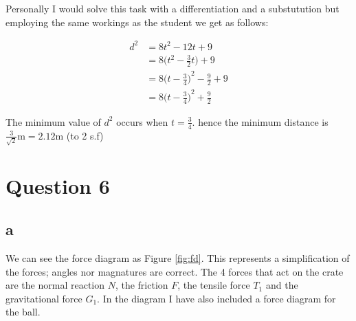 \documentclass{article}
\begin{document}

Personally I would solve this task with a differentiation and a substutution but employing the same workings as the student we get as follows:

\begin{align}
	d^2 & = 8 t^2 - 12 t + 9                       \label{eq:2l1}         \\
	    & = 8\Big(t^2 - \frac 32 t\Big) + 9                \label{eq:2l2} \\
	    & = 8{\Big(t - \frac 34\Big)}^2 - \frac 92 + 9 \label{eq:2l3}     \\
	    & = 8{\Big(t - \frac 34\Big)}^2 + \frac 92 \label{eq:2l4}
\end{align}

\begin{center}
	\parbox{7cm}{
		The minimum value of $d^2$ occurs when $t =\frac 34$.
		hence the minimum distance is $\frac 3{\sqrt 2} \mathrm m = 2.12\mathrm m $ (to 2 s.f)}
\end{center}

\section{Question 6}

\subsection{a}

We can see the force diagram as Figure \ref{fig:fd}. This represents a simplification of the forces; angles nor magnatures are correct. The 4 forces that act on the crate are the normal reaction $N$, the friction $F$, the tensile force $T_1$ and the gravitational force $G_1$. In the diagram I have also included a force diagram for the ball.
\end{document}
